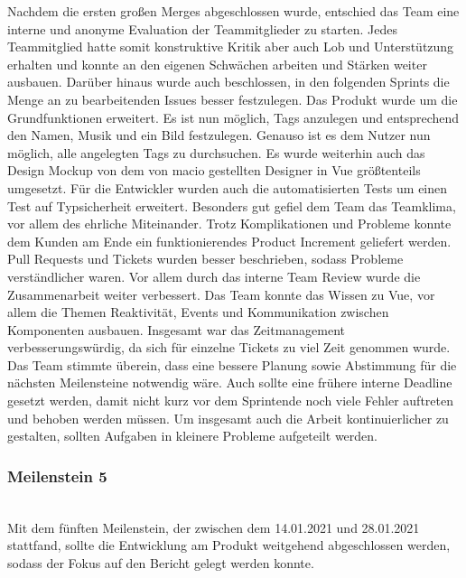 \documentclass[10pt, a4paper]{article}
\begin{document}
Nachdem die ersten großen Merges abgeschlossen wurde, entschied das Team eine interne und anonyme Evaluation der Teammitglieder zu starten.
Jedes Teammitglied hatte somit konstruktive Kritik aber auch Lob und Unterstützung erhalten und konnte an den eigenen Schwächen arbeiten und Stärken weiter ausbauen.
Darüber hinaus wurde auch beschlossen, in den folgenden Sprints die Menge an zu bearbeitenden Issues besser festzulegen.
Das Produkt wurde um die Grundfunktionen erweitert.
Es ist nun möglich, Tags anzulegen und entsprechend den Namen, Musik und ein Bild festzulegen.
Genauso ist es dem Nutzer nun möglich, alle angelegten Tags zu durchsuchen.
Es wurde weiterhin auch das Design Mockup von dem von macio gestellten Designer in Vue größtenteils umgesetzt.
Für die Entwickler wurden auch die automatisierten Tests um einen Test auf Typsicherheit erweitert.
Besonders gut gefiel dem Team das Teamklima, vor allem des ehrliche Miteinander.
Trotz Komplikationen und Probleme konnte dem Kunden am Ende ein funktionierendes Product Increment geliefert werden.
Pull Requests und Tickets wurden besser beschrieben, sodass Probleme verständlicher waren.
Vor allem durch das interne Team Review wurde die Zusammenarbeit weiter verbessert.
Das Team konnte das Wissen zu Vue, vor allem die Themen Reaktivität, Events und Kommunikation zwischen Komponenten ausbauen.
Insgesamt war das Zeitmanagement verbesserungswürdig, da sich für einzelne Tickets zu viel Zeit genommen wurde.
Das Team stimmte überein, dass eine bessere Planung sowie Abstimmung für die nächsten Meilensteine notwendig wäre.
Auch sollte eine frühere interne Deadline gesetzt werden, damit nicht kurz vor dem Sprintende noch viele Fehler auftreten und behoben werden müssen.
Um insgesamt auch die Arbeit kontinuierlicher zu gestalten, sollten Aufgaben in kleinere Probleme aufgeteilt werden.

\subsubsection*{Meilenstein 5} $~$ \\
Mit dem fünften Meilenstein, der zwischen dem 14.01.2021 und 28.01.2021 stattfand, sollte die Entwicklung am Produkt weitgehend abgeschlossen werden, sodass der Fokus auf den Bericht gelegt werden konnte.
\end{document}
